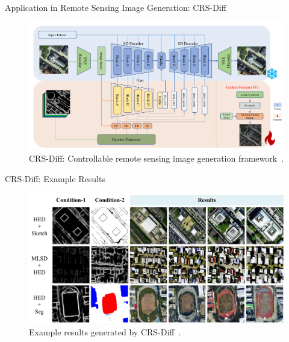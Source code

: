 \begin{refsection}
\begin{frame}{Application in Remote Sensing Image Generation: CRS-Diff}
  \begin{figure}
    \centering
    \includegraphics[width=0.9\linewidth]{figs/crsdiff.png}
    \caption[]{\scriptsize CRS-Diff: Controllable remote sensing image generation framework~\parencite{tang2024crsdiff}.}
  \end{figure}
  \bottomleftrefs
\end{frame}
\end{refsection}

\begin{refsection}
\begin{frame}{CRS-Diff: Example Results}
  \begin{figure}
    \centering
    \includegraphics[width=0.9\linewidth]{figs/crsdiff_results.png}
    \caption[]{\scriptsize Example results generated by CRS-Diff~\parencite{tang2024crsdiff}.}
  \end{figure}
  \bottomleftrefs
\end{frame}
\end{refsection}


